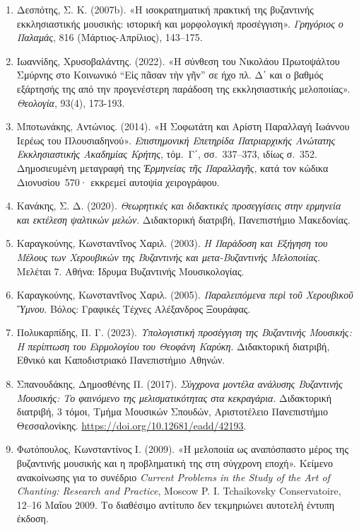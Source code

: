 \documentclass[11pt,a4paper]{article}
\begin{document}
\begin{enumerate}
Δεσπότης, Σ. Κ. (2007a). «Ερμηνευτικές προσεγγίσεις στο μουσικό υλικό της ελληνικής ψαλτικής τέχνης». \emph{Γρηγόριος ο Παλαμάς}, 818, 417--428.
\item
 Δεσπότης, Σ. Κ. (2007b). «Η ισοκρατηματική πρακτική της βυζαντινής εκκλησιαστικής μουσικής: ιστορική και μορφολογική προσέγγιση». \emph{Γρηγόριος ο Παλαμάς}, 816 (Μάρτιος-Απρίλιος), 143--175.
\item
 Ιωαννίδης, Χρυσοβαλάντης. (2022). «Η σύνθεση του Νικολάου Πρωτοψάλτου Σμύρνης στο Κοινωνικό ``Εἰς πᾶσαν τὴν γῆν'' σε ήχο πλ. Δ΄ και ο βαθμός εξάρτησής της από την προγενέστερη παράδοση της εκκλησιαστικής μελοποιίας». \emph{Θεολογία}, 93(4), 173-193.
\item
 Μποτωνάκης, Αντώνιος. (2014). «Η Σοφωτάτη και Αρίστη Παραλλαγή Ιωάννου Ιερέως του Πλουσιαδηνού». \emph{Επιστημονική Επετηρίδα Πατριαρχικής Ανώτατης Εκκλησιαστικής Ακαδημίας Κρήτης}, τόμ.~Γ΄, σσ.~337--373, ιδίως σ.~352. Δημοσιευμένη μεταγραφή της \emph{Ἑρμηνείας τῆς Παραλλαγῆς}, κατά τον κώδικα Διονυσίου~570· εκκρεμεί αυτοψία χειρογράφου.
\item
 Κανάκης, Σ. Δ. (2020). \emph{Θεωρητικές και διδακτικές προσεγγίσεις στην ερμηνεία και εκτέλεση ψαλτικών μελών}. Διδακτορική διατριβή, Πανεπιστήμιο Μακεδονίας.
\item
 Καραγκούνης, Κωνσταντῖνος Χαριλ. (2003). \emph{Η Παράδοση και Εξήγηση του Μέλους των Χερουβικών της Βυζαντινής και μετα-Βυζαντινής Μελοποιίας}. Μελέται 7. Αθήνα: Ίδρυμα Βυζαντινής Μουσικολογίας.
\item
 Καραγκούνης, Κωνσταντῖνος Χαριλ. (2005). \emph{Παραλειπόμενα περὶ τοῦ Χερουβικοῦ Ὕμνου}. Βόλος: Γραφικές Τέχνες Αλέξανδρος Ξουράφας.
\item
 Πολυκαρπίδης, Π. Γ. (2023). \emph{Υπολογιστική προσέγγιση της Βυζαντινής Μουσικής: Η περίπτωση του Ειρμολογίου του Θεοφάνη Καρύκη}. Διδακτορική διατριβή, Εθνικό και Καποδιστριακό Πανεπιστήμιο Αθηνών.
\item
 Σπανουδάκης, Δημοσθένης Π. (2017). \emph{Σύγχρονα μοντέλα ανάλυσης Βυζαντινής Μουσικής: Το φαινόμενο της μελισματικότητας στα κεκραγάρια}. Διδακτορική διατριβή, 3 τόμοι, Τμήμα Μουσικών Σπουδών, Αριστοτέλειο Πανεπιστήμιο Θεσσαλονίκης. \url{https://doi.org/10.12681/eadd/42193}.
\item
Φωτόπουλος, Κωνσταντίνος Ι. (2009). «Η μελοποιία ως αναπόσπαστο μέρος της βυζαντινής μουσικής και η προβληματική της στη σύγχρονη εποχή». Κείμενο ανακοίνωσης για το συνέδριο \emph{Current Problems in the Study of the Art of Chanting: Research and Practice}, Moscow P. I. Tchaikovsky Conservatoire, 12--16 Μαΐου 2009. Το διαθέσιμο αντίτυπο δεν τεκμηριώνει αυτοτελή έντυπη έκδοση.

\end{enumerate}
\end{document}
